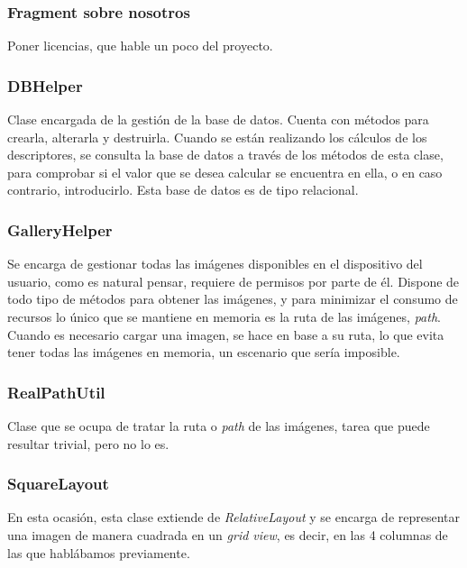 \subsubsection{Fragment sobre nosotros}

Poner licencias, que hable un poco del proyecto.
 
\subsubsection{DBHelper}

Clase encargada de la gestión de la base de datos. Cuenta con métodos para crearla, alterarla y destruirla. Cuando se están realizando los cálculos de los descriptores, se consulta la base de datos a través de los métodos de esta clase, para comprobar si el valor que se desea calcular se encuentra en ella, o en caso contrario, introducirlo. Esta base de datos es de tipo relacional.

\subsubsection{GalleryHelper}

Se encarga de gestionar todas las imágenes disponibles en el dispositivo del usuario, como es natural pensar, requiere de permisos por parte de él. Dispone de todo tipo de métodos para obtener las imágenes, y para minimizar el consumo de recursos lo único que se mantiene en memoria es la ruta de las imágenes, \textit{path}. Cuando es necesario cargar una imagen, se hace en base a su ruta, lo que evita tener todas las imágenes en memoria, un escenario que sería imposible.

\subsubsection{RealPathUtil}

Clase que se ocupa de tratar la ruta o \textit{path} de las imágenes, tarea que puede resultar trivial, pero no lo es.

\subsubsection{SquareLayout}

En esta ocasión, esta clase extiende de \textit{RelativeLayout} y se encarga de representar una imagen de manera cuadrada en un \textit{grid view}, es decir, en las 4 columnas de las que hablábamos previamente.


